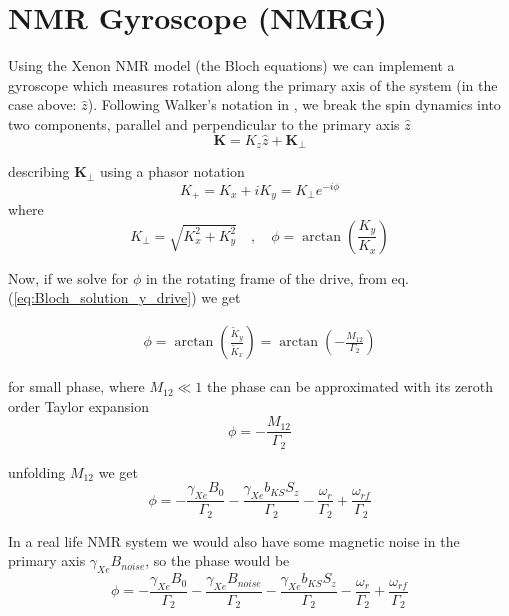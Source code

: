 \documentclass{article}
\begin{document}
\section{NMR Gyroscope (NMRG)}
Using the Xenon NMR model (the Bloch equations) we can implement a gyroscope which measures rotation along the primary axis of the system (in the case above: $\hat{z}$). 
Following Walker's notation in \cite{walker2016spin}, we break the spin dynamics into two components, parallel and perpendicular to the primary axis $\hat{z}$  $$\mathbf{K}=K_z\hat{z}+\mathbf{K}_{\perp}$$

describing $\mathbf{K}_{\perp}$ using a phasor notation
$$K_{+} = K_x + iK_y = K_{\perp}e^{-i\phi}$$
where $$K_{\perp}=\sqrt{K_x^2+K_y^2}\quad, \quad \phi=\arctan{\left(\frac{K_y}{K_x}\right)}$$




Now, if we solve for $\phi$ in the rotating frame of the drive, from eq.(\ref{eq:Bloch_solution_y_drive}) we get

\begin{align}
    \phi = \arctan{\left(\frac{\tilde{K}_y}{\tilde{K}_x}\right)}=\arctan{\left(-\frac{M_{12}}{\Gamma_2}\right)}
\end{align}

for small phase, where $M_{12}\ll 1$ the phase can be approximated with its zeroth order Taylor expansion $$\phi= -\frac{M_{12}}{\Gamma_2}$$

unfolding $M_{12}$ we get
$$\phi= -\frac{\gamma_{Xe}B_0}{\Gamma_2}-\frac{\gamma_{Xe}b_{KS}S_z}{\Gamma_2}-\frac{\omega_r}{\Gamma_2}+\frac{\omega_{rf}}{\Gamma_2}$$

In a real life NMR system we would also have some magnetic noise in the primary axis $\gamma_{Xe} B_{noise}$, so the phase would be
$$\phi= -\frac{\gamma_{Xe}B_0}{\Gamma_2}-\frac{\gamma_{Xe}B_{noise}}{\Gamma_2}-\frac{\gamma_{Xe}b_{KS}S_z}{\Gamma_2}-\frac{\omega_r}{\Gamma_2}+\frac{\omega_{rf}}{\Gamma_2}$$
\end{document}
